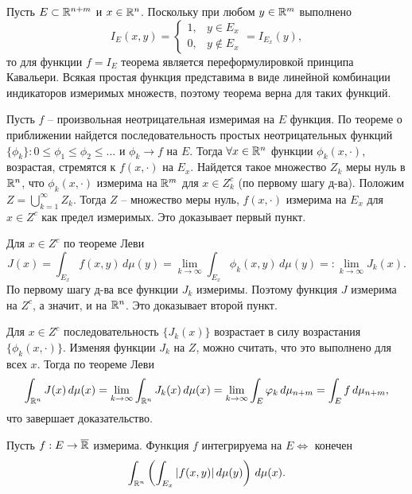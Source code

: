 \begin{myproof}
	Пусть $E \subset \mathbb{R}^{n+m}$ и $x \in \mathbb{R}^n$. Поскольку при любом $y \in \mathbb{R}^m$ выполнено 
	\[ I_E (x, y) = \begin{cases}
	 1, & y\in E_x  \\  
	 0, & y\notin E_x 
	\end{cases} = I_{E_x} (y), \]
	то для функции $f = I_E$ теорема является переформулировкой принципа Кавальери. 
	Всякая простая функция представима в виде линейной комбинации индикаторов измеримых множеств, поэтому теорема верна для таких функций. 

	\vspace{5pt}
	Пусть $f$ -- произвольная неотрицательная измеримая на $E$ функция. 
	По теореме о приближении найдется последовательность простых неотрицательных функций $\{\phi_k\} : 0 \leq \phi_1 \leq \phi_2 \leq \dotsc$ и $\phi_k \to f$ на $E$. 
	Тогда $\forall x \in \mathbb{R}^n$ функции $\phi_k (x, \cdot)$, возрастая, стремятся к $f(x, \cdot)$ на $E_x$. 
	Найдется такое множество $Z_k$ меры нуль в $\mathbb{R}^n$, что $\phi_k(x, \cdot)$ измерима на $\mathbb{R}^m$ для $x \in Z^c_k$ (по первому шагу д-ва). 
	Положим $Z = \bigcup \limits_{k=1}^{\infty} Z_k$. Тогда $Z$ -- множество меры нуль, $f(x, \cdot)$ измерима на $E_x$ для $x \in Z^c$ как предел измеримых. Это доказывает первый пункт.

	\vspace{5pt}
	Для $x \in Z^c$ по теореме Леви 
	\[ J(x) = \int_{E_x} f(x, y) \, d\mu(y) = \lim \limits_{k \to \infty} \int_{E_x} \phi_k(x, y) \, d\mu(y) =: \lim \limits_{k \to \infty} J_k(x). \]
	По первому шагу д-ва все функции $J_k$ измеримы. Поэтому функция $J$ измерима на $Z^c$, а значит, и на $\mathbb{R}^n$. 
	Это доказывает второй пункт. 

	\vspace{5pt}
	Для $x \in Z^c$ последовательность $\{J_k(x)\}$ возрастает в силу возрастания $\{\phi_k(x, \cdot)\}$. 
	Изменяя функции $J_k$ на $Z$, можно считать, что это выполнено для всех $x$. Тогда по теореме Леви 
	\[ \int_{\mathbb{R}^n} J(x) \, d\mu(x) = \lim \limits_{k \to \infty} \int_{\mathbb{R}^n} J_k(x) \, d\mu(x) = \lim \limits_{k \to \infty} \int_{E} \varphi_k \, d\mu_{n+m} = \int_{E} f \, d\mu_{n+m}, \]
	что завершает доказательство.
\end{myproof}

\begin{corollary}
	Пусть $f : E \to \overline{\mathbb{R}}$ измерима. Функция $f$ интегрируема на $E \iff$ конечен 
	\[ \int_{\mathbb{R}^n} \left( \int_{E_x} |f(x, y)| \, d\mu(y) \right) \, d\mu(x). \]
\end{corollary}

